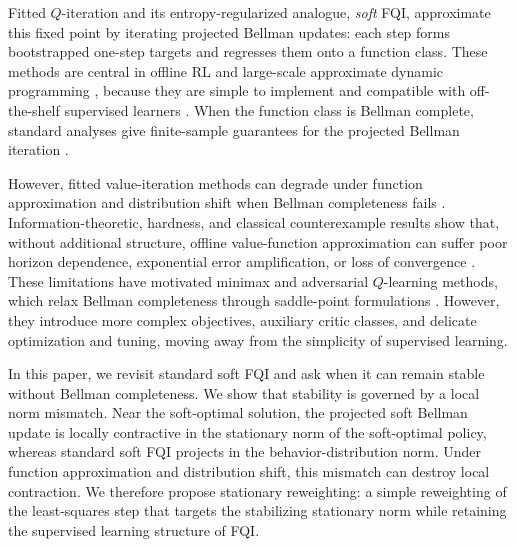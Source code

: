 \documentclass{article}
\theoremstyle{plain}
\theoremstyle{definition}
\theoremstyle{remark}
\begin{document}
Fitted \(Q\)-iteration and its entropy-regularized analogue, \emph{soft} FQI,
approximate this fixed point by iterating projected Bellman updates: each step
forms bootstrapped one-step targets and regresses them onto a function class.
These methods are central in offline RL and large-scale approximate dynamic
programming
\citep{ernst2005tree,munos2005error,lazaric2012finite,uehara2023offline},
because they are simple to implement and compatible with off-the-shelf
supervised learners
\citep{voloshin2019empirical,fujimoto2019off,le2019batch,agarwal2021deep}.
When the function class is Bellman complete, standard analyses give
finite-sample guarantees for the projected Bellman iteration
\citep{gordon1995stable,tsitsiklis1996analysis,munos2008finite,
farahmand2010error,scherrer2014approximate,fan2020theoretical}.

However, fitted value-iteration methods can degrade under function approximation
and distribution shift when Bellman completeness fails
\citep{chen2019information,patterson2022generalized,vdLaanKallus2025FQE}. Information-theoretic,
hardness, and classical counterexample results show that, without additional
structure, offline value-function approximation can suffer poor horizon
dependence, exponential error amplification, or loss of convergence
\citep{chen2019information,foster2021offline,wang2021exponential,
amortila2020variant,meyn2024projected,gordon1995stable,baird1995residual,
tsitsiklis1996analysis}. These limitations have motivated minimax and adversarial \(Q\)-learning methods,
which relax Bellman completeness through saddle-point formulations
\citep{dai2018sbeed,uehara2020minimax,uehara2021finite,uehara2023offline,
jin2021bellman,xie2021batch}. However, they introduce more complex objectives,
auxiliary critic classes, and delicate optimization and tuning, moving away from
the simplicity of supervised learning.

In this paper, we revisit standard soft FQI and ask when it can remain stable
without Bellman completeness. We show that stability is governed by a local norm
mismatch. Near the soft-optimal solution, the projected soft Bellman update is
locally contractive in the stationary norm of the soft-optimal policy, whereas
standard soft FQI projects in the behavior-distribution norm. Under function approximation
and distribution shift, this mismatch can destroy local contraction. We therefore
propose stationary reweighting: a simple reweighting of the least-squares step
that targets the stabilizing stationary norm while retaining the supervised
learning structure of FQI\@.
\end{document}

